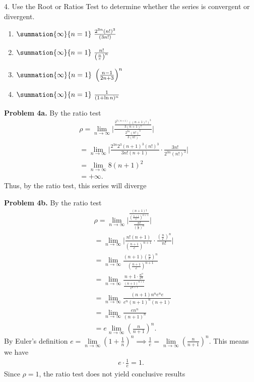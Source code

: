 \documentclass{report}
\begin{document}
    \pagebreak \bigbreak \noindent 
    \begin{mdframed}
        4. Use the Root or Ratios Test to determine whether the series is convergent or divergent.
        \begin{enumerate}[label=(\alph*)]
            \item $\summation{\infty}{n=1}\ \frac{2^{3n}(n!)^{3}}{(3n!)}\  $
            \item $\summation{\infty}{n=1}\ \frac{n!}{\left(\frac{n}{e}\right)^{n}}\  $
            \item $\summation{\infty}{n=1}\ \left(\frac{n-1}{2n+3}\right)^{n}\  $
            \item $\summation{\infty}{n=1}\ \frac{1}{(1+\ln{n})^{n}}\ $
        \end{enumerate}
    \end{mdframed}
    \bigbreak \noindent 
    \textbf{Problem 4a.} By the ratio test
    \begin{align*}
        &\rho = \lim\limits_{n \to \infty}{\bigg\lvert \frac{\frac{2^{3(n+1)}((n+1)!)^{3}}{3(n+1)!}}{\frac{2^{3n}(n!)^{3}}{3(n!)}} \bigg\rvert} \\
        &=\lim\limits_{n \to \infty}{\bigg\lvert \frac{2^{3n}2^{3}(n+1)^{3}(n!)^{3}}{3n!(n+1)} \cdot \frac{3n!}{2^{3n}(n!)^{3}} \bigg\rvert}\\
        &=\lim\limits_{n \to \infty}{8(n+1)^{2}} \\
        &=+\infty
    .\end{align*}
    \bigbreak \noindent 
    Thus, by the ratio test, this series will diverge

    \bigbreak \noindent 
    \textbf{Problem 4b.} By the ratio test
    \begin{align*}
        &\rho = \lim\limits_{n \to \infty}{\bigg\lvert \frac{\frac{(n+1)!}{\left(\frac{n+1}{e}\right)^{n+1}}}{\frac{n!}{\left(\frac{n}{e}\right)^{n}}} \bigg\rvert} \\
        &=\lim\limits_{n \to \infty}{\bigg\lvert \frac{n!(n+1)}{\left(\frac{n+1}{e}\right)^{n+1}} \cdot \frac{\left(\frac{n}{e}\right)^{n}}{n!} \bigg\rvert} \\
        &=\lim\limits_{n \to \infty}{\frac{(n+1)\left(\frac{n}{e}\right)^{n}}{\left(\frac{n+1}{e}\right)^{n+1}}} \\
        &=\lim\limits_{n \to \infty}{\frac{n+1 \cdot \frac{n^{n}}{e^{n}}}{\frac{(n+1)^{n+1}}{e^{n+1}}}} \\
        &=\lim\limits_{n \to \infty}{\frac{(n+1)n^{n}e^{n}e}{e^{n}(n+1)^{n}(n+1)}} \\
        &=\lim\limits_{n \to \infty}{\frac{en^{n}}{(n+1)^{n}}} \\ 
        &=e\lim\limits_{n \to \infty}{\left(\frac{n}{n+1}\right)^{n}}
    .\end{align*}
    \bigbreak \noindent 
    By Euler's definition $e = \lim\limits_{n \to \infty}{\left(1+\frac{1}{n}\right)^{n}} \implies \frac{1}{e} = \lim\limits_{n \to \infty}{\left(\frac{n}{n+1}\right)^{n}}$. This means we have
    \begin{align*}
        e \cdot \frac{1}{e} = 1
    .\end{align*}
    \bigbreak \noindent 
    Since $\rho = 1$, the ratio test does not yield conclusive results
\end{document}
